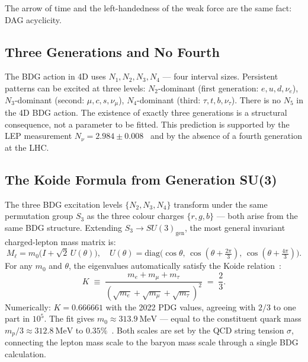 \documentclass[11pt,a4paper]{article}
\begin{document}
The arrow of time and the left-handedness of the weak force are the
same fact: DAG acyclicity.

\subsection{Three Generations and No Fourth}

The BDG action in 4D uses $N_1, N_2, N_3, N_4$ --- four interval
sizes. Persistent patterns can be excited at three levels:
$N_2$-dominant (first generation: $e, u, d, \nu_e$),
$N_3$-dominant (second: $\mu, c, s, \nu_\mu$),
$N_4$-dominant (third: $\tau, t, b, \nu_\tau$).
There is no $N_5$ in the 4D BDG action. The existence of exactly three
generations is a structural consequence, not a parameter to be fitted.
This prediction is supported by the LEP measurement $N_\nu = 2.984 \pm
0.008$~\citep{PDG2022} and by the absence of a fourth generation at the LHC.

\subsection{The Koide Formula from Generation SU(3)}

The three BDG excitation levels $\{N_2, N_3, N_4\}$ transform under the
same permutation group $S_3$ as the three colour charges $\{r, g, b\}$
--- both arise from the same BDG structure. Extending $S_3 \to
SU(3)_{\mathrm{gen}}$, the most general invariant charged-lepton mass
matrix is:
\begin{equation}
  M_\ell = m_0\bigl(I + \sqrt{2}\,U(\theta)\bigr), \quad
  U(\theta) = \mathrm{diag}\bigl(\cos\theta,\,
  \cos(\theta + \tfrac{2\pi}{3}),\,
  \cos(\theta + \tfrac{4\pi}{3})\bigr).
  \label{eq:koide_matrix}
\end{equation}
For any $m_0$ and $\theta$, the eigenvalues automatically satisfy the
Koide relation~\citep{Koide1983}:
\begin{equation}
  K \;\equiv\; \frac{m_e + m_\mu + m_\tau}{(\sqrt{m_e} + \sqrt{m_\mu}
  + \sqrt{m_\tau})^2} \;=\; \frac{2}{3}.
  \label{eq:koide}
\end{equation}
Numerically: $K = 0.666661$ with the 2022 PDG values, agreeing with $2/3$
to one part in $10^5$. The fit gives $m_0 \approx 313.9~\mathrm{MeV}$
--- equal to the constituent quark mass $m_p/3 \approx 312.8~\mathrm{MeV}$
to $0.35\%$~\citep{Sandeman2026RASM}. Both scales are set by the QCD
string tension $\sigma$, connecting the lepton mass scale to the baryon
mass scale through a single BDG calculation.
\end{document}
